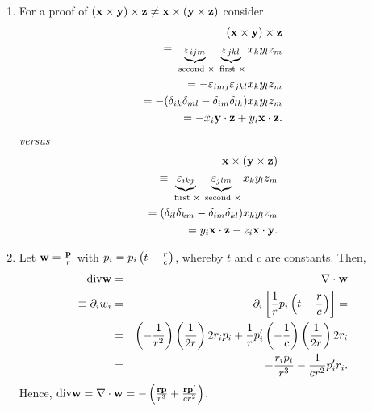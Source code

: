 {\begin{enumerate}
\item        For a proof of
$({{\bf x} } \times {{\bf y}})\times {{\bf z}}
\neq
{{\bf x} } \times ({{\bf y}}\times {{\bf z}})$ consider
\begin{equation}
\begin{split}
({{\bf x} } \times {{\bf y}})\times {{\bf z}}\\
\equiv
\underbrace{\varepsilon_{ijm}}_{\text{ second } \times}
\underbrace{\varepsilon_{jkl}}_{\text{ first } \times}
x_k y_l z_m\\=
-\varepsilon_{imj}
\varepsilon_{jkl}
x_k y_l z_m\\ =
-(\delta_{ik}\delta_{ml}-
\delta_{im}\delta_{lk})
x_k y_l z_m\\ =
-x_i {{\bf y}}\cdot {{\bf z}}+
y_i {{\bf x}}\cdot {{\bf z}}.
\end{split}
\end{equation}
{\it versus}
\begin{equation}
\begin{split}
{{\bf x} } \times ({{\bf y}}\times {{\bf z}})\\
\equiv
\underbrace{\varepsilon_{ikj}}_{\text{ first } \times}
\underbrace{\varepsilon_{jlm}}_{\text{ second } \times}
x_k y_l z_m\\ =
(\delta_{il}\delta_{km}-
\delta_{im}\delta_{kl})
x_k y_l z_m\\ =
y_i {{\bf x}}\cdot {{\bf z}}-
z_i {{\bf x}}\cdot {{\bf y}}.
\end{split}
\end{equation}





\item
Let ${\bf w} = { {{\bf p}} \over r} $ with  $p_i=p_i\left(t  - {r \over c}\right)$,
whereby   $t$ and $c$  are constants. Then,
\begin{eqnarray*}
  \mbox{div}{\bf w}& = &
\nabla \cdot {\bf w}\\
\equiv \partial_i w_i & = & \partial_i
  \left[
    \frac{1}{r} p_i \left(t-\frac{r}{c}\right)
  \right]= \\
  & = & \left(-\frac{1}{r^2}\right)\left(\frac{1}{2r}\right)
    2r_i p_i+
    \frac{1}{r}p_i'\left(-\frac{1}{c}\right)
    \left(\frac{1}{2r}\right)2 r_i  \\
  & = & -\frac{r_i p_i}{r^3}-\frac{1}{c r^2}p_i' r_i
.
\end{eqnarray*}
Hence,
$
  \mbox{div}{\bf w}=\nabla \cdot {\bf w}=
  -\left(\frac{{\bf r} {\bf p}}{r^3}+\frac{{\bf r} {\bf p}'}{c r^2}\right)
$.




\end{enumerate}}
